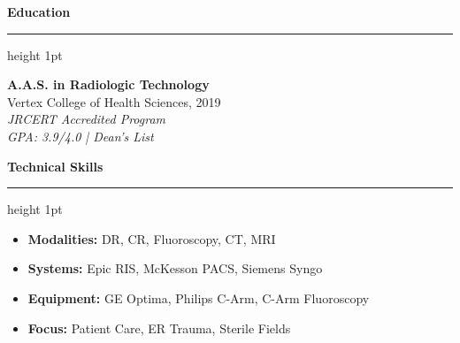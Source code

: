\documentclass[10pt,letterpaper]{article}
\newcommand{\resumesection}[1]{%
  \vspace{0.6em}%
  {\large\bfseries\color{brandblue} #1}%
  \nopagebreak[4]\par\vspace{0.2em}%
  {\color{brandblue}\hrule height 1pt}%
  \vspace{0.4em}%
}
\begin{document}
\begin{minipage}[t]{0.48\textwidth}
  \resumesection{Education}
  \textbf{A.A.S. in Radiologic Technology} \\
  Vertex College of Health Sciences, 2019 \\
  \textit{JRCERT Accredited Program} \\
  \textit{GPA: 3.9/4.0 | Dean's List}
\end{minipage}%
\hfill
\begin{minipage}[t]{0.48\textwidth}
  \resumesection{Technical Skills}
  \begin{itemize}[leftmargin=*,noitemsep,topsep=1pt,parsep=1pt,partopsep=0pt]
    \item \textbf{Modalities:} DR, CR, Fluoroscopy, CT, MRI
    \item \textbf{Systems:} Epic RIS, McKesson PACS, Siemens Syngo
    \item \textbf{Equipment:} GE Optima, Philips C-Arm, C-Arm Fluoroscopy
    \item \textbf{Focus:} Patient Care, ER Trauma, Sterile Fields
  \end{itemize}
\end{minipage}
\end{document}
